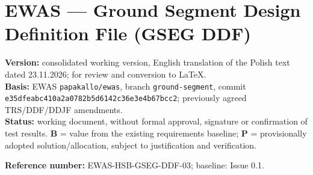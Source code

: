 \section*{EWAS — Ground Segment Design Definition File (GSEG DDF)}

\textbf{Version:} consolidated working version, English translation of the Polish text dated 23.11.2026; for review and conversion to LaTeX.\\
\textbf{Basis:} EWAS \texttt{papakallo/\allowbreak{}ewas}, branch \texttt{ground-\allowbreak{}segment}, commit \texttt{e35dfeab\allowbreak{}c410a2a0\allowbreak{}782b5d61\allowbreak{}42c36e3e\allowbreak{}4b67bcc2}; previously agreed TRS/\allowbreak{}DDF/\allowbreak{}DDJF amendments.\\
\textbf{Status:} working document, without formal approval, signature or confirmation of test results. \textbf{B} = value from the existing requirements baseline; \textbf{P} = provisionally adopted solution/\allowbreak{}allocation, subject to justification and verification.

\textbf{Reference number:} EWAS-HSB-GSEG-DDF-03; baseline: Issue 0.1.
